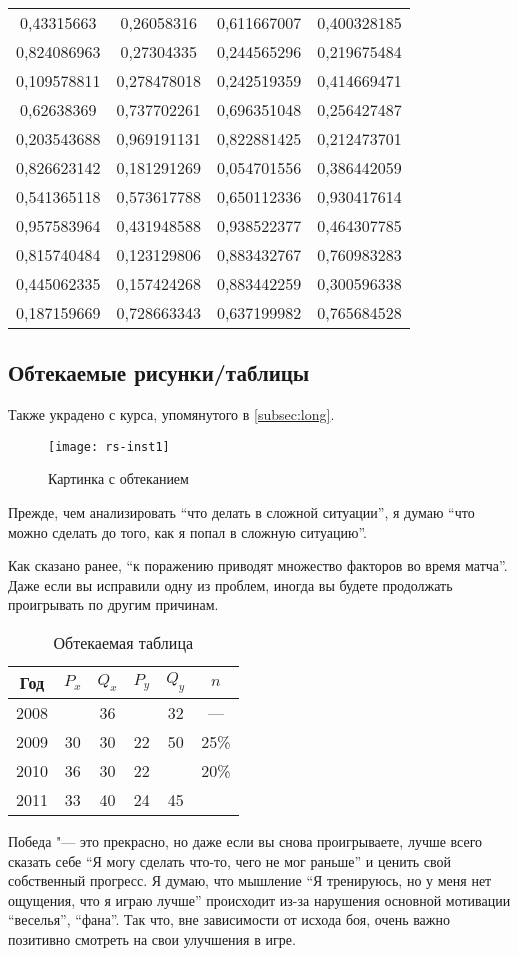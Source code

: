 \begin{longtable}{|c|c|c|c|}
0,43315663  & 0,26058316  & 0,611667007 & 0,400328185 \\
0,824086963 & 0,27304335  & 0,244565296 & 0,219675484 \\
0,109578811 & 0,278478018 & 0,242519359 & 0,414669471 \\
0,62638369  & 0,737702261 & 0,696351048 & 0,256427487 \\
0,203543688 & 0,969191131 & 0,822881425 & 0,212473701 \\
0,826623142 & 0,181291269 & 0,054701556 & 0,386442059 \\
0,541365118 & 0,573617788 & 0,650112336 & 0,930417614 \\
0,957583964 & 0,431948588 & 0,938522377 & 0,464307785 \\
0,815740484 & 0,123129806 & 0,883432767 & 0,760983283 \\
0,445062335 & 0,157424268 & 0,883442259 & 0,300596338 \\
0,187159669 & 0,728663343 & 0,637199982 & 0,765684528 \\
\end{longtable}

\subsection{Обтекаемые рисунки/таблицы}
Также украдено с курса, упомянутого в \vref{subsec:long}. ~\\

\begin{wrapfigure}{l}{0.5\linewidth}
	\texttt{[image: rs-inst1]}
	\caption{Картинка с обтеканием}
\end{wrapfigure}
Прежде, чем анализировать "`что делать в сложной ситуации"', я думаю "`что можно сделать до того, как я попал в сложную ситуацию"'. 

Как сказано ранее, "`к поражению приводят множество факторов во время матча"'. Даже если вы исправили одну из проблем, иногда вы будете продолжать проигрывать по другим причинам.

\begin{wraptable}{r}{0.5\linewidth}
	\centering
	\begin{tabular}{|c|c|c|c|c|c|}
		\hline
		Год  & $P_x$ & $Q_x$ & $P_y$ & $Q_y$ & $n$  \\ \hline
		2008 &       & 36    &       & 32    & — 	\\ \hline
		2009 & 30    & 30    & 22    & 50    & 25\% \\ \hline
		2010 & 36    & 30    & 22    &       & 20\% \\ \hline
		2011 & 33    & 40    & 24    & 45    & 		\\ \hline
	\end{tabular}
	\caption{Обтекаемая таблица}
\end{wraptable}
Победа "--- это прекрасно, но даже если вы снова проигрываете, лучше всего сказать себе
"`Я могу сделать что-то, чего не мог раньше"' и ценить свой собственный прогресс.
Я думаю, что мышление "`Я тренируюсь, но у меня нет ощущения, что я играю лучше"' происходит из-за нарушения основной мотивации "`веселья"', "`фана"'. Так что, вне зависимости от исхода боя, очень важно позитивно смотреть на свои улучшения в игре.

